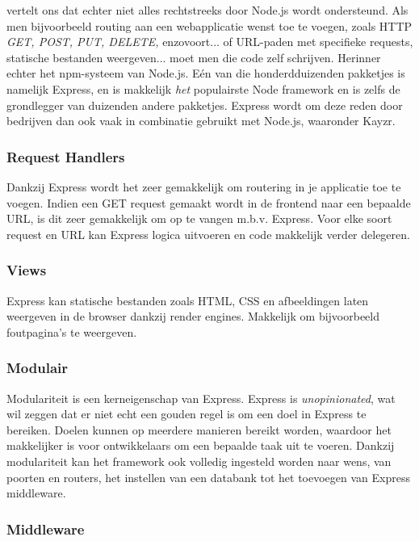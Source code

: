 \textcite{ExpressMozilla} vertelt ons dat echter niet alles rechtstreeks door Node.js wordt ondersteund. Als men bijvoorbeeld routing aan een webapplicatie wenst toe te voegen, zoals HTTP \textsl{GET, POST, PUT, DELETE,} enzovoort... of URL-paden met specifieke requests, statische bestanden weergeven... moet men die code zelf schrijven. Herinner echter het npm-systeem van Node.js. Eén van die honderdduizenden pakketjes is namelijk Express, en is makkelijk \textit{het} populairste Node framework en is zelfs de grondlegger van duizenden andere pakketjes. Express wordt om deze reden door bedrijven dan ook vaak in combinatie gebruikt met Node.js, waaronder Kayzr. 

\subsubsection{Request Handlers}
\label{sec:reqHandlers}

Dankzij Express wordt het zeer gemakkelijk om routering in je applicatie toe te voegen. Indien een GET request gemaakt wordt in de frontend naar een bepaalde URL, is dit zeer gemakkelijk om op te vangen m.b.v. Express. Voor elke soort request en URL kan Express logica uitvoeren en code makkelijk verder delegeren.

\subsubsection{Views}
\label{sec:expressViews}

Express kan statische bestanden zoals HTML, CSS en afbeeldingen laten weergeven in de browser dankzij render engines. Makkelijk om bijvoorbeeld foutpagina's te weergeven.

\subsubsection{Modulair}
\label{sec:expressModularity}

Modulariteit is een kerneigenschap van Express. Express is \textit{unopinionated}, wat wil zeggen dat er niet echt een gouden regel is om een doel in Express te bereiken. Doelen kunnen op meerdere manieren bereikt worden, waardoor het makkelijker is voor ontwikkelaars om een bepaalde taak uit te voeren. Dankzij modulariteit kan het framework ook volledig ingesteld worden naar wens, van poorten en routers, het instellen van een databank tot het toevoegen van Express middleware. 

\subsubsection{Middleware}
\label{sec:expressMiddleware}

